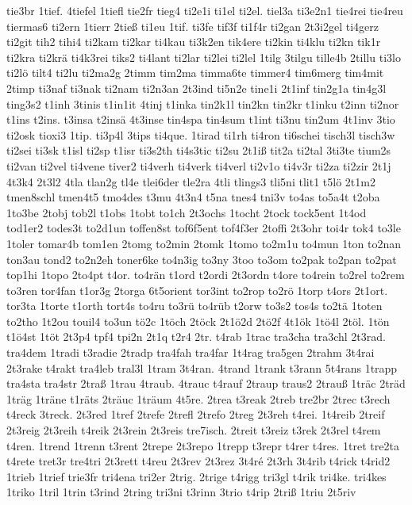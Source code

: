 {tie3br
1tief.
4tiefel
1tiefl
tie2fr
tieg4
ti2e1i
ti1el
ti2el.
tiel3a
ti3e2n1
tie4rei
tie4reu
tiermas6
ti2ern
1tierr
2tieß
ti1eu
1tif.
ti3fe
tif3f
ti1f4r
ti2gan
2t3i2gel
ti4gerz
ti2git
tih2
tihi4
ti2kam
ti2kar
ti4kau
ti3k2en
tik4ere
ti2kin
ti4klu
ti2kn
tik1r
ti2kra
ti2krä
ti4k3rei
tiks2
ti4lant
ti2lar
ti2lei
ti2lel
1tilg
3tilgu
tille4b
2tillu
ti3lo
ti2lö
tilt4
ti2lu
ti2ma2g
2timm
tim2ma
timma6te
timmer4
tim6merg
tim4mit
2timp
ti3naf
ti3nak
ti2nam
ti2n3an
2t3ind
ti5n2e
tine1i
2t1inf
tin2g1a
tin4g3l
ting3s2
t1inh
3tinis
t1in1it
4tinj
t1inka
tin2k1l
tin2kn
tin2kr
t1inku
t2inn
ti2nor
t1ins
t2ins.
t3insa
t2insä
4t3inse
tin4spa
tin4sum
t1int
ti3nu
tin2um
4t1inv
3tio
ti2osk
tioxi3
1tip.
ti3p4l
3tips
ti4que.
1tirad
ti1rh
ti4ron
ti6schei
tisch3l
tisch3w
ti2sei
ti3sk
t1isl
ti2sp
t1isr
ti3s2th
ti4s3tic
ti2su
2t1iß
tit2a
ti2tal
3ti3te
tium2s
ti2van
ti2vel
ti4vene
tiver2
ti4verh
ti4verk
ti4verl
ti2v1o
ti4v3r
ti2za
ti2zir
2t1j
4t3k4
2t3l2
4tla
tlan2g
tl4e
tlei6der
tle2ra
4tli
tlings3
tli5ni
tlit1
t5lö
2t1m2
tmen8schl
tmen4t5
tmo4des
t3mu
4t3n4
t5na
tnes4
tni3v
to4as
to5a4t
t2oba
1to3be
2tobj
tob2l
t1obs
1tobt
to1ch
2t3ochs
1tocht
2tock
tock5ent
1t4od
tod1er2
todes3t
to2d1un
toffen8st
tof6f5ent
tof4f3er
2toffi
2t3ohr
toi4r
tok4
to3le
1toler
tomar4b
tom1en
2tomg
to2min
2tomk
1tomo
to2m1u
to4mun
1ton
to2nan
ton3au
tond2
to2n2eh
toner6ke
to4n3ig
to3ny
3too
to3om
to2pak
to2pan
to2pat
top1hi
1topo
2to4pt
t4or.
to4rän
t1ord
t2ordi
2t3ordn
t4ore
to4rein
to2rel
to2rem
to3ren
tor4fan
t1or3g
2torga
6t5orient
tor3int
to2rop
to2rö
1torp
t4ors
2t1ort.
tor3ta
1torte
t1orth
tort4s
to4ru
to3rü
to4rüb
t2orw
to3s2
tos4s
to2tä
1toten
to2tho
1t2ou
touil4
to3un
tö2c
1töch
2töck
2t1ö2d
2tö2f
4t1ök
1tö4l
2töl.
1tön
t1ö4st
1töt
2t3p4
tpf4
tpi2n
2t1q
t2r4
2tr.
t4rab
1trac
tra3cha
tra3chl
2t3rad.
tra4dem
1tradi
t3radie
2tradp
tra4fah
tra4far
1t4rag
tra5gen
2trahm
3t4rai
2t3rake
t4rakt
tra4leb
tral3l
1tram
3t4ran.
4trand
1trank
t3rann
5t4rans
1trapp
tra4sta
tra4str
2traß
1trau
4traub.
4trauc
t4rauf
2traup
traus2
2trauß
1träc
2träd
1träg
1träne
t1räts
2träuc
1träum
4t5re.
2trea
t3reak
2treb
tre2br
2trec
t3rech
t4reck
3treck.
2t3red
1tref
2trefe
2trefl
2trefo
2treg
2t3reh
t4rei.
1t4reib
2treif
2t3reig
2t3reih
t4reik
2t3rein
2t3reis
tre7isch.
2treit
t3reiz
t3rek
2t3rel
t4rem
t4ren.
1trend
1trenn
t3rent
2trepe
2t3repo
1trepp
t3repr
t4rer
t4res.
1tret
tre2ta
t4rete
tret3r
tre4tri
2t3rett
t4reu
2t3rev
2t3rez
3t4ré
2t3rh
3t4rib
t4rick
t4rid2
1trieb
1trief
trie3fr
tri4ena
tri2er
2trig.
2trige
t4rigg
tri3gl
t4rik
tri4ke.
tri4kes
1triko
1tril
1trin
t3rind
2tring
tri3ni
t3rinn
3trio
t4rip
2triß
1triu
2t5riv
}
